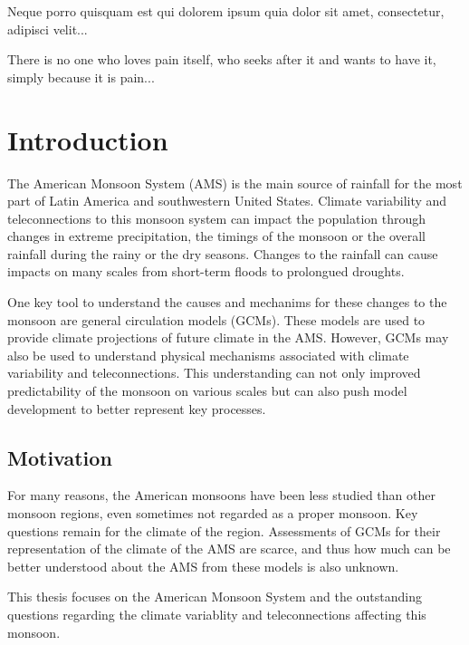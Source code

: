 \begin{savequote}[8cm]
\textlatin{Neque porro quisquam est qui dolorem ipsum quia dolor sit amet, consectetur, adipisci velit...}

There is no one who loves pain itself, who seeks after it and wants to have it, simply because it is pain...
\end{savequote}

\chapter{\label{ch:1-intro}Introduction} 

\minitoc





The American Monsoon System (AMS) is the main source of rainfall for the most part of Latin America and southwestern United States. 
Climate variability and teleconnections to this monsoon system can impact the population through changes in extreme precipitation, the timings of the monsoon or the overall rainfall during the rainy or the dry seasons. Changes to the rainfall can cause impacts on many scales from short-term floods to prolongued droughts.  

One key tool to understand the causes and mechanims for these changes to the monsoon are general circulation models (GCMs). These models are used to provide climate projections of future climate in the AMS. However, GCMs may also be used to understand physical mechanisms associated with climate variability and teleconnections. This understanding can not only improved predictability of the monsoon on various scales but can also push model development to better represent key processes.

\section{Motivation}

For many reasons, the American monsoons have been less studied than other monsoon regions, even sometimes not regarded as a proper monsoon. Key questions remain for the climate of the region. 
Assessments of GCMs for their representation of the climate of the AMS are scarce, and thus how much can be better understood about the AMS from these models is also unknown. 


 This thesis focuses on the American Monsoon System and the outstanding questions regarding the climate variablity and teleconnections affecting this monsoon.
 
